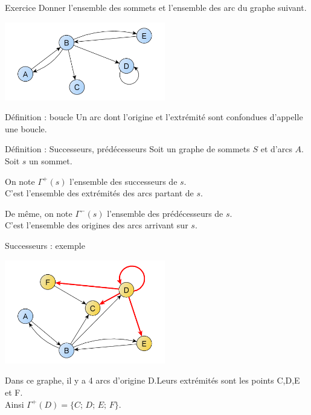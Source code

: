 \documentclass[10pt]{beamer}
\begin{document}
\begin{frame}{Exercice}
Donner l'ensemble des sommets et l'ensemble des arc du graphe suivant.
\begin{center}
\includegraphics[width=7cm]{img/exo_graphe.png}
\end{center}
\end{frame}
\begin{frame}{Définition : boucle}
Un arc dont l'origine et l'extrémité sont confondues d'appelle une \alert{boucle}.
\end{frame}
\begin{frame}{Définition : Successeurs, prédécesseurs}
Soit un graphe de sommets $S$ et d'arcs $A$. Soit $s$ un sommet.\\\pause

On note $\Gamma^+(s)$ l'ensemble des \alert{successeurs de $s$}.\\\pause
C'est l'ensemble des extrémités des arcs \alert{partant de $s$}.\\\pause

De même, on note $\Gamma^-(s)$ l'ensemble des \alert{prédécesseurs de $s$}.\\\pause
C'est l'ensemble des origines des arcs \alert{arrivant sur $s$}.\\
\end{frame}
\begin{frame}{Successeurs : exemple}
\begin{center}
\includegraphics[width=7cm]{img/successeurs.png}
\end{center}
Dans ce graphe, il y a 4 arcs d'origine D.\pause Leurs extrémités sont les points C,D,E et F.\\\pause
Ainsi $\Gamma^+(D)=\{C;\,D;\,E;\,F\}$.
\end{frame}
\end{document}
